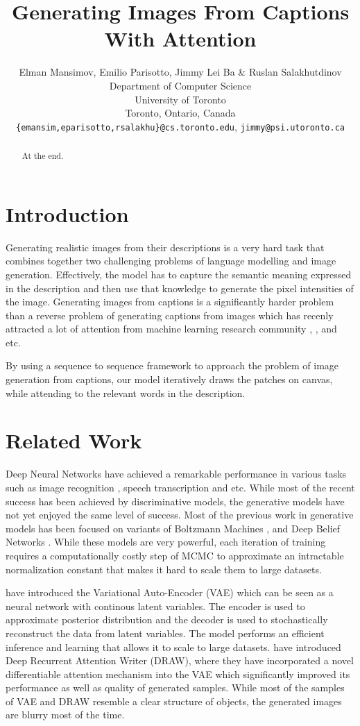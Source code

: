 \documentclass{article} %
\title{Generating Images From Captions\\ With Attention}
\author{
Elman Mansimov, Emilio Parisotto, Jimmy Lei Ba \& Ruslan Salakhutdinov\\
Department of Computer Science\\
University of Toronto\\
Toronto, Ontario, Canada \\
\texttt{\{emansim,eparisotto,rsalakhu\}@cs.toronto.edu}, \texttt{jimmy@psi.utoronto.ca}
}
\begin{document}
\maketitle

\begin{abstract}
At the end.
\end{abstract}

\section{Introduction}

Generating realistic images from their descriptions is a very hard task that combines together two challenging problems of language modelling and image generation. Effectively, the model has to capture the semantic meaning expressed in the description and then use that knowledge to generate the pixel intensities of the image. Generating images from captions is a significantly harder problem than a reverse problem of generating captions from images which has recenly attracted a lot of attention from machine learning research community \citep{karpathy_captions}, \citep{xu_captions}, \citep{kiros_captions} and etc. 

By using a sequence to sequence framework to approach the problem of image generation from captions, our model iteratively draws the patches on canvas, while attending to the relevant words in the description.


\section{Related Work}

Deep Neural Networks have achieved a remarkable performance in various tasks such as image recognition \citep{krizhevsky_imagenet}, speech transcription \citep{graves_speech} and etc. While most of the recent success has been achieved by discriminative models, the generative models have not yet enjoyed the same level of success. Most of the previous work in generative models has been focused on variants of Boltzmann Machines \citep{smolensky_rbm}, \citep{russ_dbm} and Deep Belief Networks \citep{hinton_dbn}. While these models are very powerful, each iteration of training requires a computationally costly step of MCMC to approximate an intractable normalization constant that makes it hard to scale them to large datasets.

\cite{kingma_vae} have introduced the Variational Auto-Encoder (VAE) which can be seen as a neural network with continous latent variables. The encoder is used to approximate posterior distribution and the decoder is used to stochastically reconstruct the data from latent variables. The model performs an efficient inference and learning that allows it to scale to large datasets. \cite{gregor_draw} have introduced Deep Recurrent Attention Writer (DRAW), where they have incorporated a novel differentiable attention mechanism into the VAE which significantly improved its performance as well as quality of generated samples. While most of the samples of VAE and DRAW resemble a clear structure of objects, the generated images are blurry most of the time.
\end{document}
